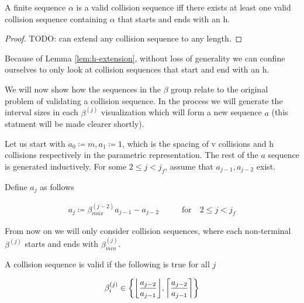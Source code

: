 
\begin{lemma}\label{lem:h-extension}
	A finite sequence $\alpha$ is a valid collision sequence iff there exists at least one valid collision sequence containing $\alpha$ that starts and ends with an h.
\end{lemma}

\begin{proof}
	TODO: can extend any collision sequence to any length. 
\end{proof}

Because of Lemma \ref{lem:h-extension}, without loss of generality we can confine ourselves to only look at collision sequences that start and end with an h.


We will now show how the sequences in the $\beta$ group relate to the original problem of validating a collision sequence. In the process we will generate the interval sizes in each $\beta^{(j)}$ visualization which will form a new sequence $a$ (this statment will be made clearer shortly). 

Let us start with $a_0 \coloneqq m, a_1 \coloneqq 1$, which is the spacing of v collisions and h collisions respectively in the parametric representation. The rest of the $a$ sequence is generated inductively. For some $2 \le j < j_f$, assume that $a_{j-1}, a_{j-2}$ exist. 

\begin{definition}
	Define $a_j$ as follows

	\begin{align}
		a_{j} \coloneqq \beta^{(j-2)}_{max} a_{j-1} - a_{j-2} \qquad &\text{for} \quad 2 \le j < j_f
	\end{align}
\end{definition}

From now on we will only consider collision sequences, where each non-terminal $\beta^{(j)}$ starts and ends with $\beta^{(j)}_{min}$.


\begin{theorem}\label{thm:beta_i}
	A collision sequence is valid if the following is true for all $j$

	\begin{equation}
		\beta^{(j)}_i \in \cbracket{\floor{\frac{a_{j-2}}{a_{j-1}}}, \ceil{\frac{a_{j-2}}{a_{j-1}}}}
	\end{equation}
\end{theorem}

